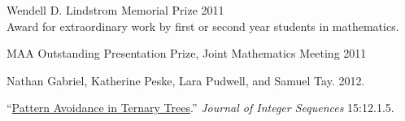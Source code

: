 \documentclass[11pt,article,oneside]{memoir}
\begin{document}
\ind Wendell D. Lindstrom Memorial Prize \hfill {\small 2011} \\
\footnotesize
  Award for extraordinary work by first or second year students in mathematics.
\normalsize

\ind MAA Outstanding Presentation Prize, Joint Mathematics Meeting \hfill {\small 2011} \\


\ind Nathan Gabriel, Katherine Peske, Lara Pudwell, and Samuel Tay. 2012.

\noindent ``\href{http://arxiv.org/abs/1110.2225}{Pattern Avoidance in Ternary Trees}.''
  \emph{Journal of Integer Sequences} 15:12.1.5. \vspace{0.05in}
\end{document}
